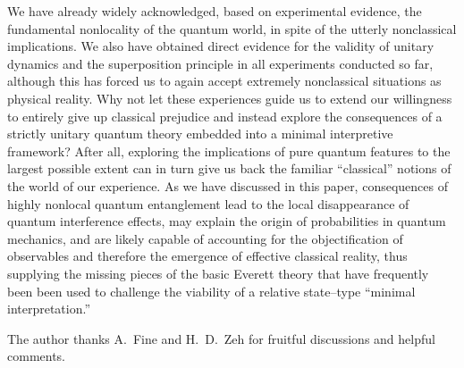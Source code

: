 \documentclass[twocolumn,aps,floatfix,amsmath,amssymb,showpacs,nofootinbib]{revtex4}
\begin{document}
We have already widely acknowledged, based on experimental evidence,
the fundamental nonlocality of the quantum world, in spite of the
utterly nonclassical implications. We also have obtained direct
evidence for the validity of unitary dynamics and the superposition
principle in all experiments conducted so far, although this has
forced us to again accept extremely nonclassical situations as
physical reality. Why not let these experiences guide us to extend our
willingness to entirely give up classical prejudice and instead
explore the consequences of a strictly unitary quantum theory embedded
into a minimal interpretive framework?  After all, exploring the
implications of pure quantum features to the largest possible extent
can in turn give us back the familiar ``classical'' notions of the
world of our experience. As we have discussed in this paper,
consequences of highly nonlocal quantum entanglement lead to the local
disappearance of quantum interference effects, may explain the origin
of probabilities in quantum mechanics, and are likely capable of
accounting for the objectification of observables and therefore the
emergence of effective classical reality, thus supplying the missing
pieces of the basic Everett theory that have frequently been been used
to challenge the viability of a relative state--type ``minimal
interpretation.''



\begin{acknowledgements}
  
The author thanks A.\ Fine and H.\ D.\ Zeh for fruitful
discussions and helpful comments.

\end{acknowledgements}


\end{document}
